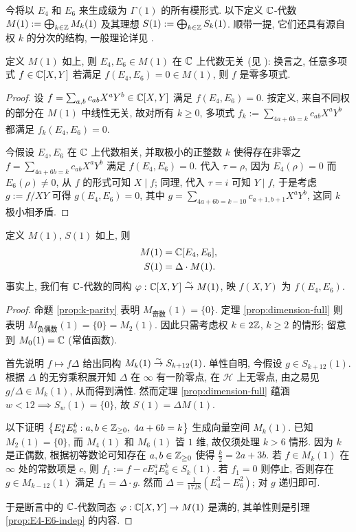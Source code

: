 今将以 $E_4$ 和 $E_6$ 来生成级为 $\Gamma(1)$ 的所有模形式. 以下定义 $\mathbb{C}$-代数 $M(1) := \bigoplus_{k \in \mathbb{Z}} M_k(1)$ 及其理想 $S(1) := \bigoplus_{k \in \mathbb{Z}} S_k(1)$. 顺带一提, 它们还具有源自权 $k$ 的分次的结构, 一般理论详见 \cite[\S 7.4]{Li1}.

\begin{lemma}\label{prop:E4-E6-indep}
	定义 $M(1)$ 如上, 则 $E_4, E_6 \in M(1)$ 在 $\mathbb{C}$ 上代数无关 (见 \cite[\S 8.8]{Li1}): 换言之, 任意多项式 $f \in \mathbb{C}[X,Y]$ 若满足 $f(E_4, E_6) = 0 \in M(1)$, 则 $f$ 是零多项式.
\end{lemma}
\begin{proof}
	设 $f = \sum_{a,b} c_{ab} X^a Y^b \in \mathbb{C}[X,Y]$ 满足 $f(E_4, E_6)=0$. 按定义, 来自不同权的部分在 $M(1)$ 中线性无关, 故对所有 $k \geq 0$, 多项式 $f_k := \sum_{4a+6b=k} c_{ab} X^a Y^b$ 都满足 $f_k(E_4, E_6) = 0$.
	
	今假设 $E_4, E_6$ 在 $\mathbb{C}$ 上代数相关, 并取极小的正整数 $k$ 使得存在非零之 $f = \sum_{4a+6b=k} c_{ab} X^a Y^b$ 满足 $f(E_4, E_6) = 0$. 代入 $\tau = \rho$, 因为 $E_4(\rho)=0$ 而 $E_6(\rho) \neq 0$, 从 $f$ 的形式可知 $X \mid f$; 同理, 代入 $\tau = i$ 可知 $Y \mid f$, 于是考虑 $g := f/XY$ 可得 $g(E_4, E_6)=0$, 其中 $g = \sum_{4a+6b=k-10} c_{a+1, b+1} X^a Y^b$, 这同 $k$ 极小相矛盾.
\end{proof}

\begin{theorem}
	定义 $M(1)$, $S(1)$ 如上, 则
	\begin{align*}
		M(1) & = \mathbb{C}[E_4, E_6], \\
		S(1) & = \Delta \cdot M(1).
	\end{align*}
	事实上, 我们有 $\mathbb{C}$-代数的同构 $\varphi: \mathbb{C}[X,Y] \stackrel{\sim}{\rightarrow} M(1)$, 映 $f(X,Y)$ 为 $f(E_4, E_6)$.
\end{theorem}
\begin{proof}
	命题 \ref{prop:k-parity} 表明 $M_{\text{奇数}}(1) = \{0\}$. 定理 \ref{prop:dimension-full} 则表明 $M_{\text{负偶数}}(1) = \{0\} = M_2(1)$. 因此只需考虑权 $k \in 2\mathbb{Z}$, $k \geq 2$ 的情形; 留意到 $M_0(1) = \mathbb{C}$ (常值函数).

	首先说明 $f \mapsto f\Delta$ 给出同构 $M_k(1) \stackrel{\sim}{\rightarrow} S_{k+12}(1)$. 单性自明, 今假设 $g \in S_{k+12}(1)$. 根据 $\Delta$ 的无穷乘积展开知 $\Delta$ 在 $\infty$ 有一阶零点, 在 $\mathcal{H}$ 上无零点, 由之易见 $g/\Delta \in M_k(1)$, 从而得到满性. 然而定理 \ref{prop:dimension-full} 蕴涵 $w < 12 \implies S_w(1) = \{0\}$, 故 $S(1) = \Delta M(1)$.

	以下证明 $\left\{ E_4^a E_6^b : a,b \in \mathbb{Z}_{\geq 0},\; 4a+6b=k \right\}$ 生成向量空间 $M_k(1)$. 已知 $M_2(1) = \{0\}$, 而 $M_4(1)$ 和 $M_6(1)$ 皆 $1$ 维, 故仅须处理 $k > 6$ 情形. 因为 $k$ 是正偶数, 根据初等数论可知存在 $a,b \in \mathbb{Z}_{\geq 0}$ 使得 $\frac{k}{2} = 2a+3b$. 若 $f \in M_k(1)$ 在 $\infty$ 处的常数项是 $c$, 则 $f_1 := f - c E_4^a E_6^b \in S_k(1)$. 若 $f_1=0$ 则停止, 否则存在 $g \in M_{k-12}(1)$ 满足 $f_1 = \Delta \cdot g$. 然而 $\Delta = \frac{1}{1728} (E_4^3 - E_6^2)$; 对 $g$ 递归即可.
	
	于是断言中的 $\mathbb{C}$-代数同态 $\varphi: \mathbb{C}[X,Y] \to M(1)$ 是满的, 其单性则是引理 \ref{prop:E4-E6-indep} 的内容. 
\end{proof}

